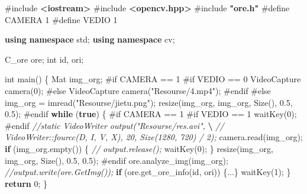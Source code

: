 \documentclass[
]{article}
\newenvironment{Shaded}{}{}
\newcommand{\CommentTok}[1]{\textcolor[rgb]{0.38,0.63,0.69}{\textit{#1}}}
\newcommand{\ControlFlowTok}[1]{\textcolor[rgb]{0.00,0.44,0.13}{\textbf{#1}}}
\newcommand{\DataTypeTok}[1]{\textcolor[rgb]{0.56,0.13,0.00}{#1}}
\newcommand{\DecValTok}[1]{\textcolor[rgb]{0.25,0.63,0.44}{#1}}
\newcommand{\ErrorTok}[1]{\textcolor[rgb]{1.00,0.00,0.00}{\textbf{#1}}}
\newcommand{\FloatTok}[1]{\textcolor[rgb]{0.25,0.63,0.44}{#1}}
\newcommand{\ImportTok}[1]{\textcolor[rgb]{0.00,0.50,0.00}{\textbf{#1}}}
\newcommand{\KeywordTok}[1]{\textcolor[rgb]{0.00,0.44,0.13}{\textbf{#1}}}
\newcommand{\NormalTok}[1]{#1}
\newcommand{\OperatorTok}[1]{\textcolor[rgb]{0.40,0.40,0.40}{#1}}
\newcommand{\PreprocessorTok}[1]{\textcolor[rgb]{0.74,0.48,0.00}{#1}}
\newcommand{\StringTok}[1]{\textcolor[rgb]{0.25,0.44,0.63}{#1}}
\begin{document}
\begin{Shaded}
\begin{Highlighting}[]
\PreprocessorTok{\#include }\ImportTok{\textless{}iostream\textgreater{}}
\PreprocessorTok{\#include }\ImportTok{\textless{}opencv.hpp\textgreater{}}
\PreprocessorTok{\#include }\ImportTok{"ore.h"}
\PreprocessorTok{\#define CAMERA }\DecValTok{1}
\PreprocessorTok{\#define VEDIO }\DecValTok{1}

\KeywordTok{using} \KeywordTok{namespace}\NormalTok{ std}\OperatorTok{;}
\KeywordTok{using} \KeywordTok{namespace}\NormalTok{ cv}\OperatorTok{;}

\NormalTok{C\_ore ore}\OperatorTok{;}
\DataTypeTok{int}\NormalTok{ id}\OperatorTok{,}\NormalTok{ ori}\OperatorTok{;}

\DataTypeTok{int}\NormalTok{ main}\OperatorTok{()} \OperatorTok{\{}
\NormalTok{	Mat img\_org}\OperatorTok{;}
\PreprocessorTok{\#if CAMERA == 1}
\PreprocessorTok{\#if VEDIO == 0}
\NormalTok{	VideoCapture camera}\OperatorTok{(}\DecValTok{0}\OperatorTok{);}
\PreprocessorTok{\#else}
\NormalTok{	VideoCapture camera}\OperatorTok{(}\StringTok{"Resourse/4.mp4"}\OperatorTok{);}
\PreprocessorTok{\#endif}
\PreprocessorTok{\#else}
\NormalTok{	img\_org }\OperatorTok{=}\NormalTok{ imread}\OperatorTok{(}\StringTok{"Resourse/jietu.png"}\OperatorTok{);}
\NormalTok{	resize}\OperatorTok{(}\NormalTok{img\_org}\OperatorTok{,}\NormalTok{ img\_org}\OperatorTok{,}\NormalTok{ Size}\OperatorTok{(),} \FloatTok{0.5}\OperatorTok{,} \FloatTok{0.5}\OperatorTok{);}
\PreprocessorTok{\#endif}
	\ControlFlowTok{while} \OperatorTok{(}\KeywordTok{true}\OperatorTok{)} \OperatorTok{\{}
\PreprocessorTok{\#if CAMERA == 1}
\PreprocessorTok{\#if VEDIO == 1}
\NormalTok{		waitKey}\OperatorTok{(}\DecValTok{0}\OperatorTok{);}
\PreprocessorTok{\#endif}
		\CommentTok{//static VideoWriter output("Resourse/res.avi", }\ErrorTok{\textbackslash{}}
\CommentTok{		//	VideoWriter::fourcc(\textquotesingle{}D\textquotesingle{}, \textquotesingle{}I\textquotesingle{}, \textquotesingle{}V\textquotesingle{}, \textquotesingle{}X\textquotesingle{}), 20, Size(1280, 720) / 2);}
\NormalTok{		camera}\OperatorTok{.}\NormalTok{read}\OperatorTok{(}\NormalTok{img\_org}\OperatorTok{);}
		\ControlFlowTok{if} \OperatorTok{(}\NormalTok{img\_org}\OperatorTok{.}\NormalTok{empty}\OperatorTok{())} \OperatorTok{\{}
		\CommentTok{//	output.release();}
\NormalTok{			waitKey}\OperatorTok{(}\DecValTok{0}\OperatorTok{);}
		\OperatorTok{\}}
\NormalTok{		resize}\OperatorTok{(}\NormalTok{img\_org}\OperatorTok{,}\NormalTok{ img\_org}\OperatorTok{,}\NormalTok{ Size}\OperatorTok{(),} \FloatTok{0.5}\OperatorTok{,} \FloatTok{0.5}\OperatorTok{);}
\PreprocessorTok{\#endif}
\NormalTok{		ore}\OperatorTok{.}\NormalTok{analyze\_img}\OperatorTok{(}\NormalTok{img\_org}\OperatorTok{);}
		\CommentTok{//output.write(ore.GetImg());}
		\ControlFlowTok{if} \OperatorTok{(}\NormalTok{ore}\OperatorTok{.}\NormalTok{get\_ore\_info}\OperatorTok{(}\NormalTok{id}\OperatorTok{,}\NormalTok{ ori}\OperatorTok{))} \OperatorTok{\{...\}}
\NormalTok{		waitKey}\OperatorTok{(}\DecValTok{1}\OperatorTok{);}
	\OperatorTok{\}}
	\ControlFlowTok{return} \DecValTok{0}\OperatorTok{;}
\OperatorTok{\}}
\end{Highlighting}
\end{Shaded}
\end{document}
